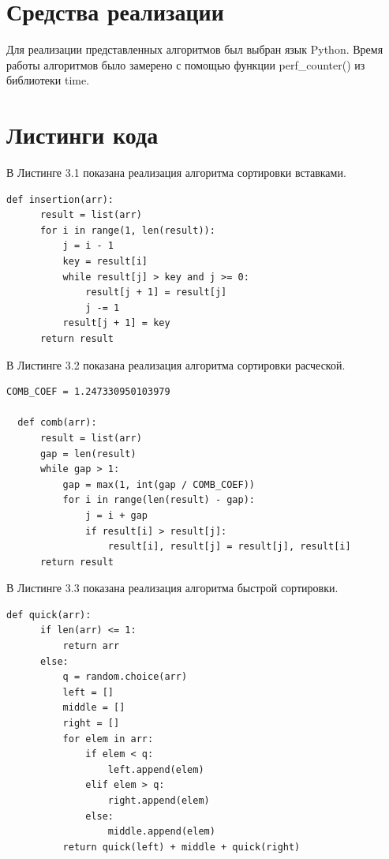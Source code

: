 \documentclass[a4paper,12pt]{report}
\begin{document}
\section{Средства реализации}
\hspace{0.6cm}Для реализации представленных алгоритмов был выбран язык Python. Время работы алгоритмов было замерено с помощью функции perf\_counter() из библиотеки time.

\section{Листинги кода}

\hspace{0.6cm}В Листинге 3.1 показана реализация алгоритма сортировки вставками.

\begin{lstlisting}[caption=Функция сортировки вставками]
  def insertion(arr):
      result = list(arr)
      for i in range(1, len(result)):
          j = i - 1
          key = result[i]
          while result[j] > key and j >= 0:
              result[j + 1] = result[j]
              j -= 1
          result[j + 1] = key
      return result
\end{lstlisting}
\newpage
В Листинге 3.2 показана реализация алгоритма сортировки расческой.
\begin{lstlisting}[caption=Функция сортировки расческой]
  COMB_COEF = 1.247330950103979
  
  def comb(arr):
      result = list(arr)
      gap = len(result)
      while gap > 1:
          gap = max(1, int(gap / COMB_COEF))
          for i in range(len(result) - gap):
              j = i + gap
              if result[i] > result[j]:
                  result[i], result[j] = result[j], result[i]
      return result
\end{lstlisting}

В Листинге 3.3 показана реализация алгоритма быстрой сортировки.
\begin{lstlisting}[caption=Функция быстрой сортировки]
  def quick(arr):
      if len(arr) <= 1:
          return arr
      else:
          q = random.choice(arr)
          left = []
          middle = []
          right = []
          for elem in arr:
              if elem < q:
                  left.append(elem)
              elif elem > q:
                  right.append(elem)
              else:
                  middle.append(elem)
          return quick(left) + middle + quick(right)
\end{lstlisting}
\end{document}
